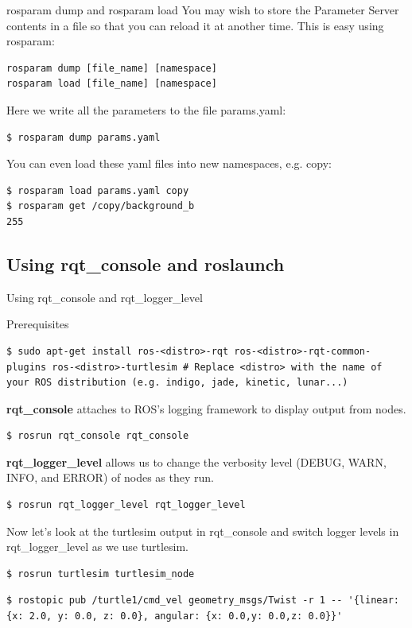 \begin{frame}[fragile]{rosparam dump and rosparam load}
You may wish to store the Parameter Server contents in a file so that you can reload it at another time. This is easy using rosparam:

\begin{lstlisting}[language=syntax]
rosparam dump [file_name] [namespace]
rosparam load [file_name] [namespace]
\end{lstlisting}

Here we write all the parameters to the file params.yaml:
\begin{lstlisting}[language=shell]
$ rosparam dump params.yaml
\end{lstlisting}
You can even load these yaml files into new namespaces, e.g. copy:
\begin{lstlisting}[language=shell]
$ rosparam load params.yaml copy
$ rosparam get /copy/background_b
255
\end{lstlisting}
\end{frame}

\subsection{Using rqt\_console and roslaunch}

\begin{frame}[fragile]{Using rqt\_console and rqt\_logger\_level}
\begin{alertblock}{Prerequisites}
\begin{lstlisting}[language=shell]
$ sudo apt-get install ros-<distro>-rqt ros-<distro>-rqt-common-plugins ros-<distro>-turtlesim # Replace <distro> with the name of your ROS distribution (e.g. indigo, jade, kinetic, lunar...)
\end{lstlisting}
\end{alertblock}

\textbf{rqt\_console} attaches to ROS's logging framework to display output from nodes.
\begin{lstlisting}[language=shell]
$ rosrun rqt_console rqt_console
\end{lstlisting}

\textbf{rqt\_logger\_level} allows us to change the verbosity level (DEBUG, WARN, INFO, and ERROR) of nodes as they run.
\begin{lstlisting}[language=shell]
$ rosrun rqt_logger_level rqt_logger_level
\end{lstlisting}
Now let's look at the turtlesim output in rqt\_console and switch logger levels in rqt\_logger\_level as we use turtlesim.
\begin{lstlisting}[language=shell]
$ rosrun turtlesim turtlesim_node
\end{lstlisting}
\begin{lstlisting}[language=shell]
$ rostopic pub /turtle1/cmd_vel geometry_msgs/Twist -r 1 -- '{linear: {x: 2.0, y: 0.0, z: 0.0}, angular: {x: 0.0,y: 0.0,z: 0.0}}'
\end{lstlisting}
\end{frame}

